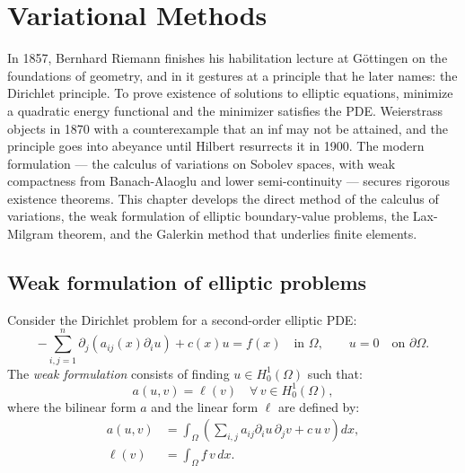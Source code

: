 \chapter{Variational Methods}
\label{ch:variational}

In 1857, Bernhard Riemann finishes his habilitation lecture at Göttingen on the foundations of geometry, and in it gestures at a principle that he later names: the Dirichlet principle. To prove existence of solutions to elliptic equations, minimize a quadratic energy functional and the minimizer satisfies the PDE. Weierstrass objects in 1870 with a counterexample that an inf may not be attained, and the principle goes into abeyance until Hilbert resurrects it in 1900. The modern formulation --- the calculus of variations on Sobolev spaces, with weak compactness from Banach-Alaoglu and lower semi-continuity --- secures rigorous existence theorems. This chapter develops the direct method of the calculus of variations, the weak formulation of elliptic boundary-value problems, the Lax-Milgram theorem, and the Galerkin method that underlies finite elements.

\section{Weak formulation of elliptic problems}

\begin{definition}
Consider the Dirichlet problem for a second-order elliptic PDE:
\begin{equation}\label{eq:dirichlet}
    -\sum_{i,j=1}^n \partial_j(a_{ij}(x) \partial_i u) + c(x) u = f(x)
    \quad \text{in } \Omega, \qquad u = 0 \quad \text{on } \partial\Omega.
\end{equation}
The \emph{weak formulation} consists of finding $u \in H_0^1(\Omega)$ such that:
\[
    a(u, v) = \ell(v) \quad \forall\, v \in H_0^1(\Omega),
\]
where the bilinear form $a$ and the linear form $\ell$ are defined by:
\begin{align*}
    a(u, v) &= \int_\Omega \left( \sum_{i,j} a_{ij} \partial_i u \, \partial_j v
    + c\, u\, v \right) dx, \\
    \ell(v) &= \int_\Omega f\, v\, dx.
\end{align*}
\end{definition}

